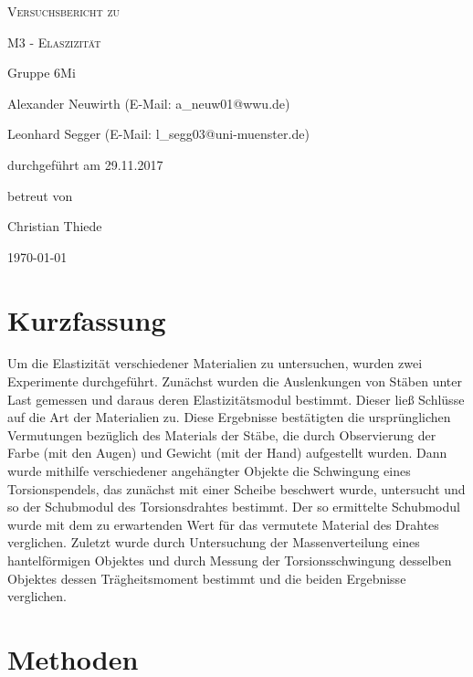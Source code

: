 \documentclass[
	a4paper,
	12pt,
	pagesize,
	ngerman
]{scrartcl}
\begin{document}
	
	\begin{titlepage}
		\centering
		{\scshape\LARGE Versuchsbericht zu \par}
		\vspace{1cm}
		{\scshape\huge M3 - Elaszizität\par}
		\vspace{2.5cm}
		{\LARGE Gruppe 6Mi \par}
		\vspace{0.5cm}
		
		{\large Alexander Neuwirth (E-Mail: a\_neuw01@wwu.de) \par}
		{\large Leonhard Segger (E-Mail: l\_segg03@uni-muenster.de) \par}
		\vfill
		
		durchgeführt am 29.11.2017\par
		betreut von\par
		{\large Christian Thiede}
		
		\vfill
		
		{\large \today\par}
	\end{titlepage}
	\tableofcontents
	\newpage
	
	\section{Kurzfassung}
	Um die Elastizität verschiedener Materialien zu untersuchen, wurden zwei Experimente durchgeführt.
	Zunächst wurden die Auslenkungen von Stäben unter Last gemessen und daraus deren Elastizitätsmodul bestimmt.
	Dieser ließ Schlüsse auf die Art der Materialien zu.
	Diese Ergebnisse bestätigten die ursprünglichen Vermutungen bezüglich des Materials der Stäbe, die durch Observierung der Farbe (mit den Augen) und Gewicht (mit der Hand) aufgestellt wurden.
	Dann wurde mithilfe verschiedener angehängter Objekte die Schwingung eines Torsionspendels, das zunächst mit einer Scheibe beschwert wurde, untersucht und so der Schubmodul des Torsionsdrahtes bestimmt.
	Der so ermittelte Schubmodul wurde mit dem zu erwartenden Wert für das vermutete Material des Drahtes verglichen.
	Zuletzt wurde durch Untersuchung der Massenverteilung eines hantelförmigen Objektes und durch Messung der Torsionsschwingung desselben Objektes dessen Trägheitsmoment bestimmt und die beiden Ergebnisse verglichen.
	\section{Methoden}
	
\end{document}
